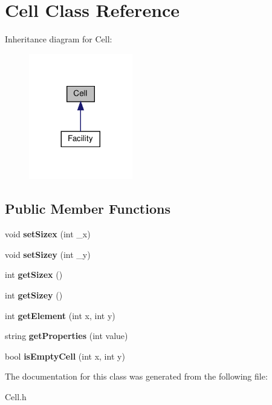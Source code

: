 \hypertarget{classCell}{}\section{Cell Class Reference}
\label{classCell}


Inheritance diagram for Cell\+:
\nopagebreak
\begin{figure}[H]
\begin{center}
\leavevmode
\includegraphics[width=128pt]{classCell__inherit__graph}
\end{center}
\end{figure}
\subsection*{Public Member Functions}
\begin{DoxyCompactItemize}
\item 
\mbox{\label{classCell_a00ad90ebf8a8397e7e6686a0c53a129c}} 
void {\bfseries set\+Sizex} (int \+\_\+x)
\item 
\mbox{\label{classCell_ae0dbdae2b884f76adcfd445ef3cbb26f}} 
void {\bfseries set\+Sizey} (int \+\_\+y)
\item 
\mbox{\label{classCell_a4fb0c2cf923dda5f0c99374ae83bc5df}} 
int {\bfseries get\+Sizex} ()
\item 
\mbox{\label{classCell_abe016b4186be0a92f5ad0d28f6742a1d}} 
int {\bfseries get\+Sizey} ()
\item 
\mbox{\label{classCell_a4856fe7f442321d862e21153cc8952e3}} 
int {\bfseries get\+Element} (int x, int y)
\item 
\mbox{\label{classCell_aeaa88a5d7cde0de11ffee7788d3412bd}} 
string {\bfseries get\+Properties} (int value)
\item 
\mbox{\label{classCell_a48bc12937e6590e6434dd81eedc55986}} 
bool {\bfseries is\+Empty\+Cell} (int x, int y)
\end{DoxyCompactItemize}


The documentation for this class was generated from the following file\+:\begin{DoxyCompactItemize}
\item 
Cell.\+h\end{DoxyCompactItemize}
